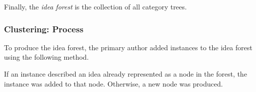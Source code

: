 Finally, the \emph{idea forest} is the collection of all category trees.





\subsubsection{Clustering: Process}
To produce the idea forest, the primary author added instances to the idea forest using the following method.

If an instance described an idea already represented as a node in the forest, the instance was added to that node. Otherwise, a new node was produced.


